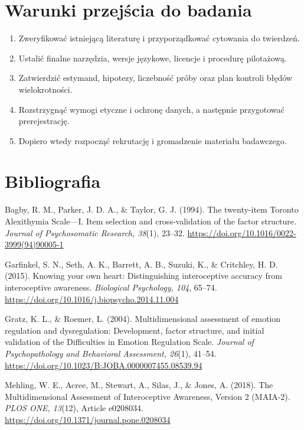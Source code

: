 \documentclass[11pt,a4paper]{article}
\begin{document}
\section{Warunki przejścia do badania}
\begin{enumerate}
\item Zweryfikować istniejącą literaturę i przyporządkować cytowania do twierdzeń.
\item Ustalić finalne narzędzia, wersje językowe, licencje i procedurę pilotażową.
\item Zatwierdzić estymand, hipotezy, liczebność próby oraz plan kontroli błędów wielokrotności.
\item Rozstrzygnąć wymogi etyczne i ochronę danych, a następnie przygotować prerejestrację.
\item Dopiero wtedy rozpocząć rekrutację i gromadzenie materiału badawczego.
\end{enumerate}
\section*{Bibliografia}

{\setlength{\parindent}{0pt}
\setlength{\parskip}{5pt}
\hangindent=1.27cm
Bagby, R. M., Parker, J. D. A., \& Taylor, G. J. (1994). The twenty-item Toronto Alexithymia Scale—I. Item selection and cross-validation of the factor structure. \textit{Journal of Psychosomatic Research, 38}(1), 23--32. \url{https://doi.org/10.1016/0022-3999(94)90005-1}\par
\hangindent=1.27cm
Garfinkel, S. N., Seth, A. K., Barrett, A. B., Suzuki, K., \& Critchley, H. D. (2015). Knowing your own heart: Distinguishing interoceptive accuracy from interoceptive awareness. \textit{Biological Psychology, 104}, 65--74. \url{https://doi.org/10.1016/j.biopsycho.2014.11.004}\par
\hangindent=1.27cm
Gratz, K. L., \& Roemer, L. (2004). Multidimensional assessment of emotion regulation and dysregulation: Development, factor structure, and initial validation of the Difficulties in Emotion Regulation Scale. \textit{Journal of Psychopathology and Behavioral Assessment, 26}(1), 41--54. \url{https://doi.org/10.1023/B:JOBA.0000007455.08539.94}\par
\hangindent=1.27cm
Mehling, W. E., Acree, M., Stewart, A., Silas, J., \& Jones, A. (2018). The Multidimensional Assessment of Interoceptive Awareness, Version 2 (MAIA-2). \textit{PLOS ONE, 13}(12), Article e0208034. \url{https://doi.org/10.1371/journal.pone.0208034}\par
}
\end{document}
